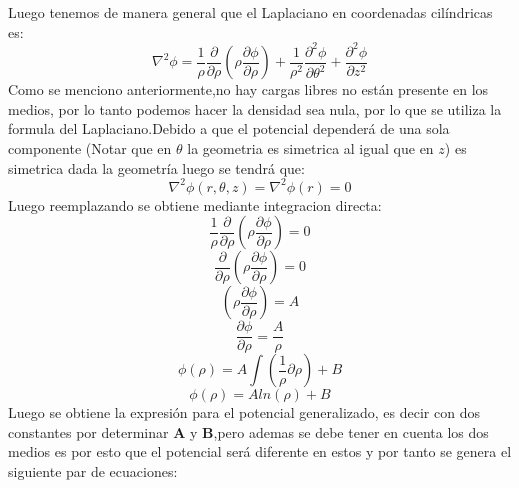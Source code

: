 \documentclass[
  11pt,
  letterpaper,
   addpoints,
   answers
  ]{exam}
\begin{document}
\begin{questions}
\begin{solution}
\begin{enumerate}
            Luego tenemos de manera general que el Laplaciano en coordenadas cilíndricas es:
            \begin{equation}
                \nabla^{2}\phi = \frac{1}{\rho} \frac{\partial}{\partial\rho}\left(\rho \frac{\partial\phi}{\partial \rho}\right) + \frac{1}{\rho^{2}}\frac{\partial^{2}\phi}{\partial\theta^{2}} + \frac{\partial^{2}\phi}{\partial z^{2}}
            \end{equation}
            Como se menciono anteriormente,no hay cargas libres no están presente en los medios, por lo tanto podemos hacer la densidad sea nula, por lo que se utiliza la formula del Laplaciano.Debido a que el potencial dependerá de una sola componente (Notar que en $\theta$ la geometria es simetrica al igual que en $z$) es simetrica dada la geometría luego se tendrá que:
            \begin{equation}
                \nabla^{2}\phi(r,\theta, z) =  \nabla^{2}\phi(r)=0
            \end{equation}            
            Luego reemplazando se obtiene mediante integracion directa:
            \begin{equation}
                \frac{1}{\rho} \frac{\partial}{\partial\rho}\left(\rho \frac{\partial \phi}{\partial \rho}\right) = 0
            \end{equation}
            \begin{equation}
                \frac{\partial}{\partial\rho}\left(\rho \frac{\partial \phi}{\partial \rho}\right) = 0
            \end{equation}
            \begin{equation}
                 \left(\rho \frac{\partial \phi}{\partial \rho}\right) = A
            \end{equation}
            \begin{equation}
                 \frac{\partial \phi}{\partial \rho} = \frac{A}{\rho}
            \end{equation}
            \begin{equation}
                 \phi(\rho) = A\int\left(\frac{1}{\rho}\partial\rho\right) + B
            \end{equation}
            \begin{equation}
                  \phi(\rho) = Aln(\rho) + B
            \end{equation}
            Luego se obtiene la expresión para el potencial generalizado, es decir con dos constantes por determinar \textbf{A} y \textbf{B},pero ademas se debe tener en cuenta los dos medios es por esto que el potencial será diferente en estos y por tanto se genera el siguiente par de ecuaciones:

\end{enumerate}
\end{solution}
\end{questions}
\end{document}
